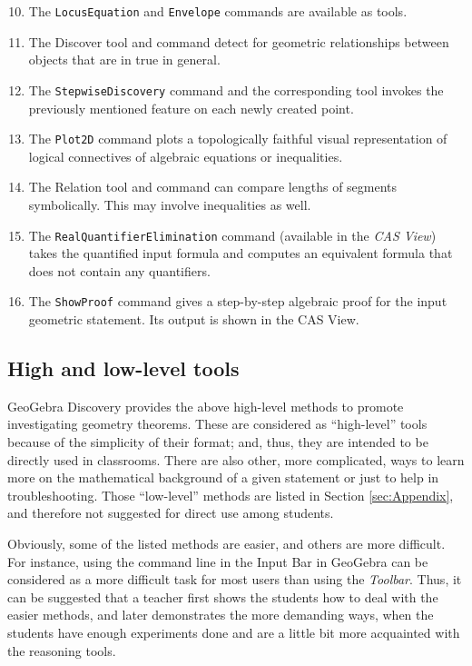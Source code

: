 \documentclass{article}
\begin{document}
\begin{enumerate}
\setcounter{enumi}{9}
    \item The \texttt{LocusEquation} and \texttt{Envelope} commands are available as tools.
    \item The Discover tool and command detect for geometric relationships between objects that are in true in general.
    \item The \texttt{StepwiseDiscovery} command and the corresponding tool invokes the previously mentioned feature on each newly created point.
    \item The \texttt{Plot2D} command plots a topologically faithful visual representation of logical connectives of algebraic equations or inequalities.
    \item The Relation tool and command can compare lengths of segments symbolically. This may involve inequalities as well.
    \item The \texttt{RealQuantifierElimination} command (available in the \textit{CAS View}) takes the quantified input formula and computes an equivalent formula that does not contain any quantifiers.
    \item The \texttt{ShowProof} command gives a step-by-step algebraic proof for the input geometric statement. Its output is shown in the CAS View.
\end{enumerate}

\subsection{High and low-level tools}

GeoGebra Discovery provides the above high-level methods to promote investigating geometry theorems. These are considered as ``high-level'' tools because of the simplicity of their  format; and, thus,  they are intended to  be directly used in classrooms. There are also other, more complicated, ways to learn more on the mathematical background of a given statement or just to help in troubleshooting. Those ``low-level'' methods are listed in Section \ref{sec:Appendix}, and therefore not suggested for direct use among students.

Obviously, some of the listed methods are easier, and others are more difficult. For instance, using the command line in the Input Bar in GeoGebra can be considered as a more difficult task for most users than using the \textit{Toolbar}. Thus, it can be suggested that a teacher first shows the students how to deal with the easier methods, and later demonstrates the more demanding ways,  when the students have enough experiments done and are a little bit more acquainted with the reasoning tools.
\end{document}
